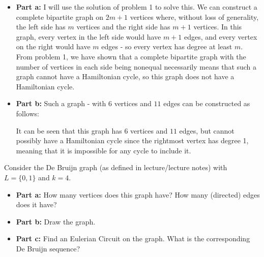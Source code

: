 \documentclass{article}
\begin{document}
\begin{solution}
\begin{itemize}
	\item[]{\textbf{Part a:}} I will use the solution of problem 1 to solve this.  We can construct a complete bipartite graph on $2m+1$ vertices where, without loss of generality, the left side has $m$ vertices and the right side has $m+1$ vertices.  In this graph, every vertex in the left side would have $m+1$ edges, and every vertex on the right would have $m$ edges - so every vertex has degree at least $m$.  From problem 1, we have shown that a complete bipartite graph with the number of vertices in each side being nonequal necessarily means that such a graph cannot have a Hamiltonian cycle, so this graph does not have a Hamiltonian cycle.
	\item[]{\textbf{Part b:}} Such a graph - with $6$ vertices and $11$ edges can be constructed as follows:
	\newline\noindent
	\vskip 0.15in\noindent
	It can be seen that this graph has $6$ vertices and $11$ edges, but cannot possibly have a Hamiltonian cycle since the rightmost vertex has degree 1, meaning that it is impossible for any cycle to include it.
\end{itemize}
\end{solution}


\begin{problem} Consider the De Bruijn graph (as defined in lecture/lecture notes) with $L = \{0,1\}$ and $k=4$.
\begin{itemize}
	\item[]{\textbf{Part a:}} How many vertices does this graph have? How many (directed) edges does it have?
	\item[]{\textbf{Part b:}} Draw the graph.
	\item[]{\textbf{Part c:}} Find an Eulerian Circuit on the graph. What is the corresponding De Bruijn sequence?
\end{itemize}
\end{problem}
\end{document}
